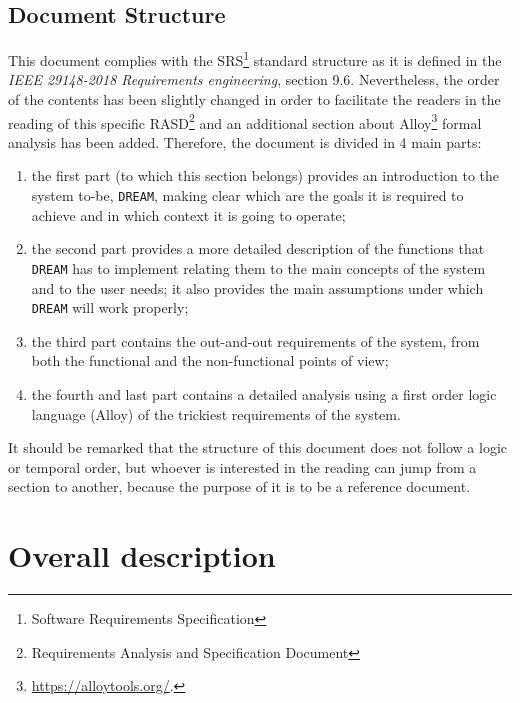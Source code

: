 \documentclass{article}
\begin{document}
\subsection{Document Structure}
This document complies with the SRS\footnote{Software Requirements Specification} standard structure as it is defined in the \textit{IEEE 29148-2018 Requirements engineering}, section 9.6. Nevertheless, the order of the contents has been slightly changed in order to facilitate the readers in the reading of this specific RASD\footnote{Requirements Analysis and Specification Document} and an additional section about Alloy\footnote{\url{https://alloytools.org/}.} formal analysis has been added.
Therefore, the document is divided in 4 main parts:
\begin{enumerate}
\item the first part (to which this section belongs) provides an introduction to the system to-be, \verb|DREAM|, making clear which are the goals it is required to achieve and in which context it is going to operate;
\item the second part provides a more detailed description of the functions that \verb|DREAM| has to implement relating them to the main concepts of the system and to the user needs; it also provides the main assumptions under which \verb|DREAM| will work properly;

\item the third part contains the out-and-out requirements of the system, from both the functional and the non-functional points of view;
\item the fourth and last part contains a detailed analysis using a first order logic language (Alloy) of the trickiest requirements of the system.
\end{enumerate}
It should be remarked that the structure of this document does not follow a logic or temporal order, but whoever is interested in the reading can jump from a section to another, because the purpose of it is to be a reference document.
\newpage
\section{Overall description}
\end{document}
